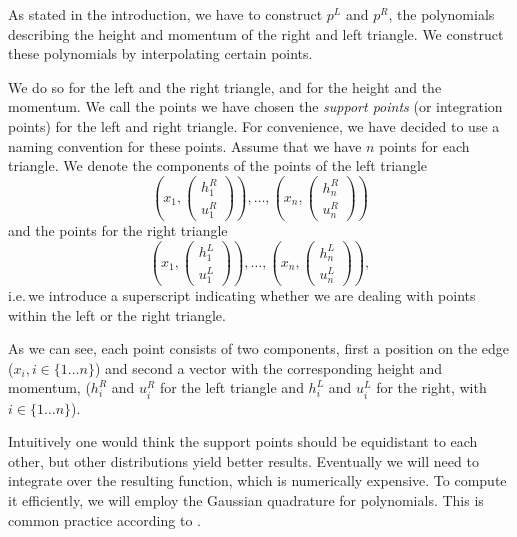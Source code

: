 \documentclass[a4paper, twoside]{article}
\begin{document}
As stated in the introduction, we have to construct $p^L$ and $p^R$, the polynomials describing the height and momentum of the right and left triangle. We construct these polynomials by interpolating certain points.

We do so for the left and the right triangle, and for the height and the momentum. We call the points we have chosen the \emph{support points} (or integration points) for the left and right triangle.
For convenience, we have decided to use a naming convention for these points.
Assume that we have $n$ points for each triangle.
We denote the components of the points of the left triangle
\begin{equation*}
\left(x_1,\begin{pmatrix}
    h_1^R \\ u_1^R
  \end{pmatrix}\right), \dots , \left(x_n, \begin{pmatrix}
    h_n^R \\ u_n^R
  \end{pmatrix}\right)
\end{equation*}
and the points for the right triangle
\begin{equation*}
\left(x_1,\begin{pmatrix}
    h_1^L \\ u_1^L
  \end{pmatrix}\right), \dots , \left(x_n,\begin{pmatrix}
    h_n^L \\ u_n^L
  \end{pmatrix}\right),
\end{equation*}
i.e.\,we introduce a superscript indicating whether we are dealing with points within the left or the right triangle.

As we can see, each point consists of two components, first a position on the edge ($x_i, i \in \{1 \dots n\}$) and second a vector with the corresponding height and momentum, ($h_i^R$ and $u_i^R$ for the left triangle and $h_i^L$ and $u_i^L$ for the right, with $i \in \{1 \dots n\}$).

Intuitively one would think the support points should be equidistant to each other, but other distributions yield better results.
Eventually we will need to integrate over the resulting function, which is numerically expensive. To compute it efficiently, we will employ the Gaussian quadrature for polynomials. This is common practice according to \cite{schwaiger08adaptive,castro07high-order-ader-fv-dg-numerical-methods,boeck08discontinuous-galerkin-verfahren}.
\end{document}
